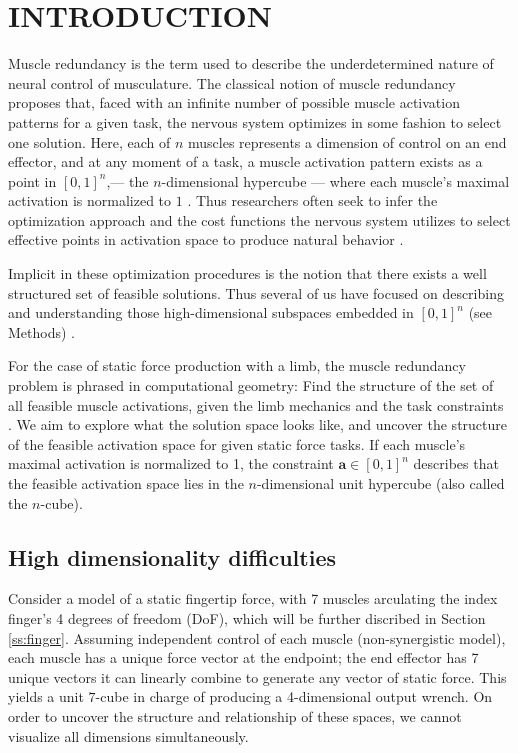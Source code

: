 
\section{INTRODUCTION}

Muscle redundancy is the term used to describe the underdetermined nature of neural control of musculature.
The classical notion of muscle redundancy  proposes that, faced with an infinite number of possible muscle activation patterns for a given task, the nervous system optimizes in some fashion to select one solution.
Here, each of $n$ muscles represents a dimension of control on an end effector, and at any moment of a task, a muscle activation pattern exists as a point in $[0,1]^n$,--- the $n$-dimensional hypercube --- where each muscle's maximal activation is normalized to $1$ \cite{Valero-Cuevas1998Large}.
Thus researchers often seek to infer the optimization approach and the cost functions the nervous system utilizes to select effective points in activation space to produce natural behavior \cite{Chao1978Graphical,Prilutsky2000Muscle,scott2004optimal,todorov2002optimal,crowninshield1981physiologically,higginson2005simulated}. 

Implicit in these optimization procedures is the notion that there exists a well structured set of feasible solutions. Thus several of us have focused on describing and understanding those high-dimensional subspaces  embedded in $[0,1]^n$ (see Methods) \cite{kutch2011muscle,kutch2012challenges,sohn2013cat_bounding_box,Valero-Cuevas1998Large,Valero-Cuevas2015high-dimensional}.

For the case of static force production with a limb, the muscle redundancy problem is phrased in computational geometry: Find the structure of the set of all feasible muscle activations, given the limb mechanics and the task constraints \cite{avis1992Pivoting,Valero-Cuevas1998Large,Valero-Cuevas2009mathematical,Valero-Cuevas2015high-dimensional}. We aim to explore what the solution space looks like, and uncover the structure of the feasible activation space for given static force tasks.
If each muscle's maximal activation is normalized to 1, the constraint $\textbf{a} \in [0,1]^n$ describes that the feasible activation space lies in the $n$-dimensional unit hypercube (also called the $n$-cube).%

\subsection{High dimensionality difficulties}
Consider a model of a static fingertip force, with 7 muscles arculating the index finger's 4 degrees of freedom (DoF), which will be further discribed in Section \ref{ss:finger}.
Assuming independent control of each muscle (non-synergistic model), each muscle has a unique force vector at the endpoint; the end effector has 7 unique vectors it can linearly combine to generate any vector of static force.
This yields a unit $7$-cube in charge of producing a 4-dimensional output wrench.
On order to uncover the structure and relationship of these spaces, we cannot visualize all dimensions simultaneously. %

